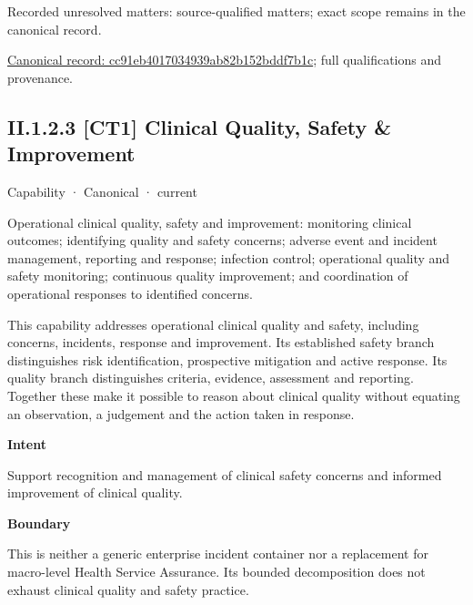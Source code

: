 {\small Recorded unresolved matters: source-qualified matters; exact scope remains in the canonical record.}\par
{\footnotesize \href{../../../../continuum/strategy/capability/cc91eb4017034939ab82b152bddf7b1c.md}{Canonical record: cc91eb4017034939ab82b152bddf7b1c}; full qualifications and provenance.}\par
\subsection*{II.1.2.3 [CT1] Clinical Quality, Safety \& Improvement}
\label{navigation:II.1.2.3}

\label{element:63837bf848774572a06b935af95581a2}
{\small Capability · Canonical · current}\par

Operational clinical quality, safety and improvement: monitoring clinical outcomes; identifying quality and safety concerns; adverse event and incident management, reporting and response; infection control; operational quality and safety monitoring; continuous quality improvement; and coordination of operational responses to identified concerns.



This capability addresses operational clinical quality and safety, including concerns, incidents, response and improvement. Its established safety branch distinguishes risk identification, prospective mitigation and active response. Its quality branch distinguishes criteria, evidence, assessment and reporting. Together these make it possible to reason about clinical quality without equating an observation, a judgement and the action taken in response.



\textbf{Intent}



Support recognition and management of clinical safety concerns and informed improvement of clinical quality.



\textbf{Boundary}



This is neither a generic enterprise incident container nor a replacement for macro-level Health Service Assurance. Its bounded decomposition does not exhaust clinical quality and safety practice.




